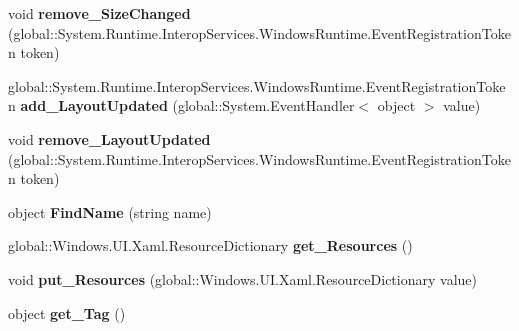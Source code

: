 \begin{DoxyCompactItemize}
\item 
\mbox{\label{interface_windows_1_1_u_i_1_1_xaml_1_1_i_framework_element_aee2c3dbe7e3702a98c8bff9f0c4720c0}} 
void {\bfseries remove\+\_\+\+Size\+Changed} (global\+::\+System.\+Runtime.\+Interop\+Services.\+Windows\+Runtime.\+Event\+Registration\+Token token)
\item 
\mbox{\label{interface_windows_1_1_u_i_1_1_xaml_1_1_i_framework_element_a25ade46d3420c73f6b9ca99a333bf905}} 
global\+::\+System.\+Runtime.\+Interop\+Services.\+Windows\+Runtime.\+Event\+Registration\+Token {\bfseries add\+\_\+\+Layout\+Updated} (global\+::\+System.\+Event\+Handler$<$ object $>$ value)
\item 
\mbox{\label{interface_windows_1_1_u_i_1_1_xaml_1_1_i_framework_element_ac054df7c36430442d26d3ce119295117}} 
void {\bfseries remove\+\_\+\+Layout\+Updated} (global\+::\+System.\+Runtime.\+Interop\+Services.\+Windows\+Runtime.\+Event\+Registration\+Token token)
\item 
\mbox{\label{interface_windows_1_1_u_i_1_1_xaml_1_1_i_framework_element_a07a0149f2dee5784c52807f935eb41d9}} 
object {\bfseries Find\+Name} (string name)
\item 
\mbox{\label{interface_windows_1_1_u_i_1_1_xaml_1_1_i_framework_element_aa9da62c1e38c8633cffa0cbd01a78dc6}} 
global\+::\+Windows.\+U\+I.\+Xaml.\+Resource\+Dictionary {\bfseries get\+\_\+\+Resources} ()
\item 
\mbox{\label{interface_windows_1_1_u_i_1_1_xaml_1_1_i_framework_element_ac37b49cdd76f27a64fdecca76f291b5d}} 
void {\bfseries put\+\_\+\+Resources} (global\+::\+Windows.\+U\+I.\+Xaml.\+Resource\+Dictionary value)
\item 
\mbox{\label{interface_windows_1_1_u_i_1_1_xaml_1_1_i_framework_element_a468d4d76ade5b5e14eccf702af30bbf9}} 
object {\bfseries get\+\_\+\+Tag} ()

\end{DoxyCompactItemize}
